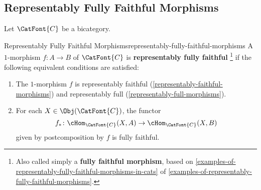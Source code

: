 \subsection{Representably Fully Faithful Morphisms}\label{subsection-representably-fully-faithful-morphisms}
Let $\CatFont{C}$ be a bicategory.
\begin{definition}{Representably Fully Faithful Morphisms}{representably-fully-faithful-morphisms}%
    A $1$-morphism $f\colon A\to B$ of $\CatFont{C}$ is \textbf{representably fully faithful}%
    \footnote{%
        Also called simply a \textbf{fully faithful morphism}, based on \cref{examples-of-representably-fully-faithful-morphisms-in-cats} of \cref{examples-of-representably-fully-faithful-morphisms}.
        \par\vspace*{-1.75\baselineskip}
    } %
    if the following equivalent conditions are satisfied:
    \begin{enumerate}
        \item\label{representably-fully-faithful-morphisms-1}The $1$-morphism $f$ is representably faithful (\cref{representably-faithful-morphisms}) and representably full (\cref{representably-full-morphisms}).
        \item\label{representably-fully-faithful-morphisms-2}For each $X\in\Obj(\CatFont{C})$, the functor
            \[
                f_{*}%
                \colon%
                \cHom_{\CatFont{C}}(X,A)%
                \to%
                \cHom_{\CatFont{C}}(X,B)%
            \]%
            given by postcomposition by $f$ is fully faithful.
    \end{enumerate}
\end{definition}
